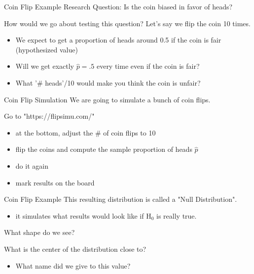 \documentclass{beamer}
\begin{document}
\begin{frame}{Coin Flip Example}
Research Question: Is the coin biased in favor of heads? \vspace{12mm}

How would we go about testing this question? Let's say we flip the coin 10 times.
\begin{itemize}
    \item We expect to get a proportion of heads around 0.5 if the coin is fair (hypothesized value)
    \item Will we get exactly $\widehat{p} = .5$ every time even if the coin is fair?
    \item What '\# heads'/10 would make you think the coin is unfair?
\end{itemize}
\end{frame}

\begin{frame}{Coin Flip Simulation}
We are going to simulate a bunch of coin flips. \vspace{14mm}

Go to "https://flipsimu.com/"
\begin{itemize}
    \item at the bottom, adjust the \# of coin flips to 10
    \item flip the coins and compute the sample proportion of heads $\widehat{p}$
    \item do it again
    \item mark results on the board
\end{itemize}
    
\end{frame}

\begin{frame}{Coin Flip Example}
This resulting distribution is called a "Null Distribution".
\begin{itemize}
    \item it simulates what results would look like if H$_0$ is really true.
\end{itemize} \vspace{8mm}

What shape do we see? \vspace{8mm}

What is the center of the distribution close to?
\begin{itemize}
    \item What name did we give to this value?
\end{itemize}\vspace{8mm}
\end{frame}
\end{document}
